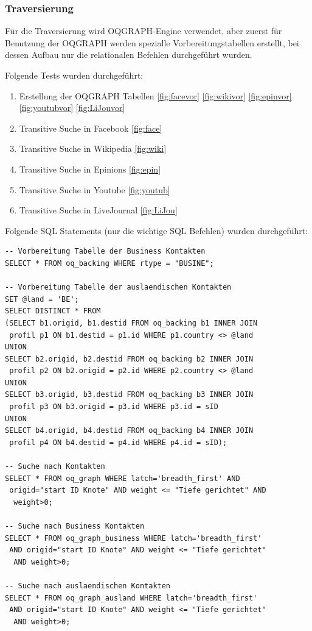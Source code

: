 \newpage

\subsubsection{Traversierung}
Für die Traversierung wird OQGRAPH-Engine verwendet, aber zuerst für Benutzung der OQGRAPH werden spezialle Vorbereitungstabellen erstellt, bei dessen Aufbau nur die relationalen Befehlen durchgeführt wurden.

Folgende Tests wurden durchgeführt:
\begin{enumerate}
	\item Erstellung der OQGRAPH Tabellen \ref{fig:facevor}
	\ref{fig:wikivor}
	\ref{fig:epinvor}
	\ref{fig:youtubvor}
	\ref{fig:LiJouvor}
	\item Transitive Suche in Facebook
	\ref{fig:face}
	\item Transitive Suche in Wikipedia
	\ref{fig:wiki}
	\item Transitive Suche in Epinions 
	\ref{fig:epin}
	\item Transitive Suche in Youtube 
	\ref{fig:youtub}
	\item Transitive Suche in LiveJournal 
	\ref{fig:LiJou}
\end{enumerate}


Folgende SQL Statements (nur die wichtige SQL Befehlen) wurden durchgeführt:
\begin{lstlisting}
-- Vorbereitung Tabelle der Business Kontakten
SELECT * FROM oq_backing WHERE rtype = "BUSINE";

-- Vorbereitung Tabelle der auslaendischen Kontakten
SET @land = 'BE';
SELECT DISTINCT * FROM 
(SELECT b1.origid, b1.destid FROM oq_backing b1 INNER JOIN
 profil p1 ON b1.destid = p1.id WHERE p1.country <> @land
UNION
SELECT b2.origid, b2.destid FROM oq_backing b2 INNER JOIN
 profil p2 ON b2.origid = p2.id WHERE p2.country <> @land
UNION
SELECT b3.origid, b3.destid FROM oq_backing b3 INNER JOIN
 profil p3 ON b3.origid = p3.id WHERE p3.id = sID
UNION
SELECT b4.origid, b4.destid FROM oq_backing b4 INNER JOIN
 profil p4 ON b4.destid = p4.id WHERE p4.id = sID);
 
-- Suche nach Kontakten
SELECT * FROM oq_graph WHERE latch='breadth_first' AND
 origid="start ID Knote" AND weight <= "Tiefe gerichtet" AND
  weight>0;
  
-- Suche nach Business Kontakten
SELECT * FROM oq_graph_business WHERE latch='breadth_first'
 AND origid="start ID Knote" AND weight <= "Tiefe gerichtet"
  AND weight>0;
  
-- Suche nach auslaendischen Kontakten
SELECT * FROM oq_graph_ausland WHERE latch='breadth_first'
 AND origid="start ID Knote" AND weight <= "Tiefe gerichtet"
  AND weight>0;
\end{lstlisting}


